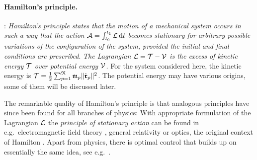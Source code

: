 \paragraph{Hamilton's principle.}
\cite[sec.\ V.1]{Lanczos:Variational}: \textit{Hamilton's principle states that the motion of a mechanical system occurs in such a way that the action} $\mathcal{A} = \int_{t_0}^{t_1} \mathcal{L}\, \mathrm{d} t$ \textit{becomes stationary for arbitrary possible variations of the configuration of the system, provided the initial and final conditions are prescribed}.
\textit{The Lagrangian $\mathcal{L}=\mathcal{T}-\mathcal{V}$ is the excess of kinetic energy $\mathcal{T}$ over potential energy $\mathcal{V}$.}
For the system considered here, the kinetic energy is $\mathcal{T} = \tfrac{1}{2} \sum\nolimits_{p=1}^{\mathfrak{N}} \mathfrak{m}_{p} \| \dot{\boldsymbol{\mathfrak{r}}}_{p} \|_{}^2$.
The potential energy may have various origins, some of them will be discussed later.


The remarkable quality of Hamilton's principle is that analogous principles have since been found for all branches of physics:
With appropriate formulation of the Lagrangian $\mathcal{L}$ the \textit{principle of stationary action} can be found in e.g.\ electromagnetic field theory \cite[ch.\ 4]{Landau:Fields}, general relativity \cite{Einstein:HamiltonsPrinciple} or optics, the original context of Hamilton \cite[p.\,192]{Klein:EntwicklungDerMathematik}.
Apart from physics, there is optimal control that builds up on essentially the same idea, see e.g.\ \cite{Bryson:AppliedOptimalControl}.


